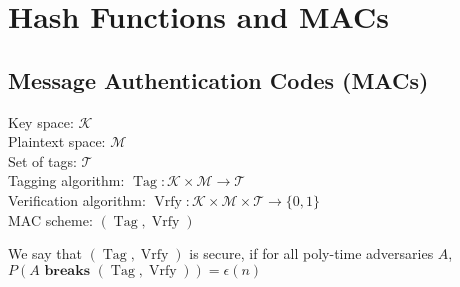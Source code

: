 \documentclass[11pt]{article}
\DeclareMathOperator{\Tag}{Tag}
\DeclareMathOperator{\Vrfy}{Vrfy}
\begin{document}
    \section{Hash Functions and MACs}

    \subsection{Message Authentication Codes (MACs)}

    Key space: $\mathcal{K}$\\
    Plaintext space: $\mathcal{M}$\\
    Set of tags: $\mathcal{T}$\\
    Tagging algorithm: $\Tag: \mathcal{K} \times \mathcal{M} \to \mathcal{T}$\\
    Verification algorithm: $\Vrfy: \mathcal{K} \times \mathcal{M} \times \mathcal{T} \to \{0, 1\}$\\
    MAC scheme: $(\Tag, \Vrfy)$

    We say that  $(\Tag, \Vrfy)$ is secure, if for all poly-time adversaries $A$,
    $P(A \textbf{ breaks } (\Tag, \Vrfy)) = \epsilon(n)$
\end{document}
